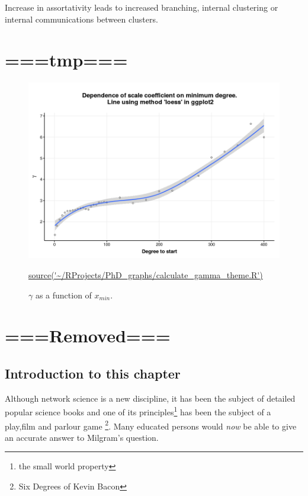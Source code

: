 Increase in assortativity leads to increased branching, internal clustering or internal communications between clusters\cite{estrada2011combinatorial}.
\section{===tmp===}
\begin{figure}
    \centering
    \includegraphics[width=\textwidth]{images/chapter3/poweRlaw/Rplot_gamma_theme.png}
    \caption[$\gamma$ as function of $x_{min}$]{$\gamma$ as a function of $x_{min}$. }
    \tiny\url{source('~/RProjects/PhD_graphs/calculate_gamma_theme.R')}
    \label{fig:gamma_main}
\end{figure}

\section{===Removed===}

\subsection{Introduction to this chapter}




Although network science is a new discipline, it has been the subject of detailed popular science books \cite{barabasi2002linked} and one of its principles\footnote{the small world property} has been the subject of a play\cite{guare1990six},film and parlour game \footnote{Six Degrees of Kevin Bacon}\cite{collins1998s}. Many educated persons would \textit{now} be able to give an accurate answer to Milgram's question. 

